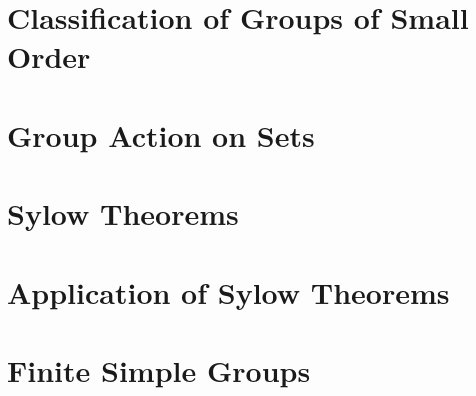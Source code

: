 \documentclass{article}
\begin{document}
\section{Classification of Groups of Small Order}

\section{Group Action on Sets}

\section{Sylow Theorems}

\section{Application of Sylow Theorems}

\section{Finite Simple Groups}
\end{document}
